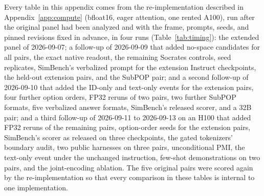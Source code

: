 \documentclass[11pt]{article}
\begin{document}
Every table in this appendix comes from the re-implementation described in
Appendix~\ref{app:compute} (bfloat16, eager attention, one rented A100), run
after the original panel had been analyzed and with the frame, prompts, seeds,
and pinned revisions fixed in advance, in four runs (Table~\ref{tab:timing}): the extended panel of 2026-09-07; a follow-up of 2026-09-09 that added no-space candidates for all pairs, the exact native readout, the remaining Socrates controls, seed replicates, SimBench's verbalized prompt for the extension Instruct checkpoints, the held-out extension pairs, and the SubPOP pair; and a second follow-up of 2026-09-10 that added the ID-only and text-only events for the extension pairs, four further option orders, FP32 reruns of two pairs, two further SubPOP formats, five verbalized answer formats, SimBench's released scorer, and a 32B pair; and a third follow-up of 2026-09-11 to 2026-09-13 on an H100 that added FP32 reruns of the remaining pairs, option-order seeds for the extension pairs, SimBench's scorer as released on three checkpoints, the gated tokenizers' boundary audit, two public harnesses on three pairs, unconditional PMI, the text-only event under the unchanged instruction, few-shot demonstrations on two pairs, and the joint-encoding ablation. The five original pairs were scored
again by the re-implementation so that every comparison in these tables is
internal to one implementation.
\end{document}
